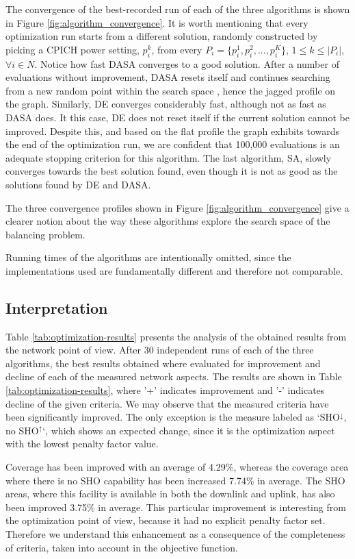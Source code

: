 The convergence of the best-recorded run of each of the three algorithms
is shown in Figure \ref{fig:algorithm_convergence}. It is worth mentioning
that every optimization run starts from a different solution, randomly
constructed by picking a CPICH power setting, $p_{i}^{k}$, from every
$P_{i}=\{p_{i}^{1},p_{i}^{2},...,p_{i}^{K}\}$, $1\le k\le|P_{i}|$,
$\forall i\in N$. Notice how fast DASA converges to a good solution.
After a number of evaluations without improvement, DASA resets itself
and continues searching from a new random point within the search
space \cite{korosec2010_DASA}, hence the jagged profile on the graph.
Similarly, DE converges considerably fast, although not as fast as
DASA does. It this case, DE does not reset itself if the current solution
cannot be improved. Despite this, and based on the flat profile the
graph exhibits towards the end of the optimization run, we are confident
that 100,000 evaluations is an adequate stopping criterion for this
algorithm. The last algorithm, SA, slowly converges towards the best
solution found, even though it is not as good as the solutions found
by DE and DASA. 

The three convergence profiles shown in Figure \ref{fig:algorithm_convergence}
give a clearer notion about the way these algorithms explore the search
space of the balancing problem.

Running times of the algorithms are intentionally omitted, since the
implementations used are fundamentally different and therefore not
comparable.


\subsection{Interpretation}

Table \ref{tab:optimization-results} presents the analysis of the
obtained results from the network point of view. After 30 independent
runs of each of the three algorithms, the best results obtained where
evaluated for improvement and decline of each of the measured network
aspects. The results are shown in Table \ref{tab:optimization-results},
where '+' indicates improvement and '-' indicates decline of the given
criteria. We may observe that the measured criteria have been significantly
improved. The only exception is the measure labeled as \textquoteleft{}SHO$^{\downarrow}$,
no SHO$^{\uparrow}$\textquoteleft{}, which shows an expected change,
since it is the optimization aspect with the lowest penalty factor
value.

Coverage has been improved with an average of 4.29\%, whereas the
coverage area where there is no SHO capability has been increased
7.74\% in average. The SHO areas, where this facility is available
in both the downlink and uplink, has also been improved 3.75\% in
average. This particular improvement is interesting from the optimization
point of view, because it had no explicit penalty factor set. Therefore
we understand this enhancement as a consequence of the completeness
of criteria, taken into account in the objective function.

